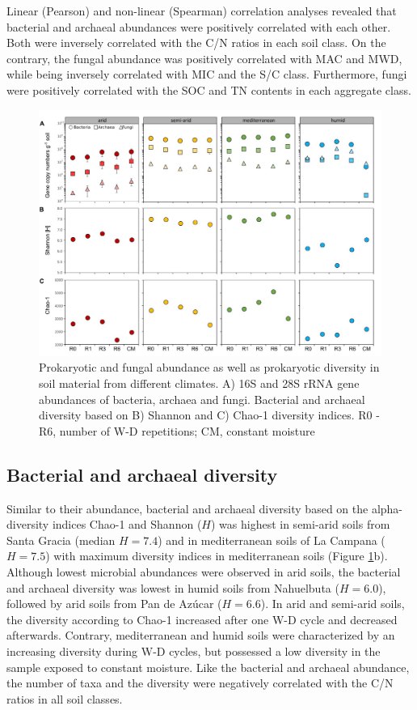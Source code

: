 Linear (Pearson) and non-linear (Spearman) correlation analyses revealed that bacterial and archaeal abundances were positively correlated with each other. Both were inversely correlated with the C/N ratios in each soil class. On the contrary, the fungal abundance was positively correlated with MAC and MWD, while being inversely correlated with MIC and the S/C class. Furthermore, fungi were positively correlated with the SOC and TN contents in each aggregate class.

\begin{figure}[H]
	\centering
	\includegraphics[width=1\textwidth]{img/M4-Figure_5.jpg}
	\caption[Prokaryotic and fungal abundance as well as prokaryotic diversity in soil material from different climates]{Prokaryotic and fungal abundance as well as prokaryotic diversity in soil material from different climates. A) 16S and 28S rRNA gene abundances of bacteria, archaea and fungi. Bacterial and archaeal diversity based on B) Shannon and C) Chao-1 diversity indices. R0 - R6, number of W-D repetitions; CM, constant moisture}
	\label{fig:M4-F5}
\end{figure}

\subsection{Bacterial and archaeal diversity}

Similar to their abundance, bacterial and archaeal diversity based on the alpha-diversity indices Chao-1 and Shannon (\(H\)) was highest in semi-arid soils from Santa Gracia (median \(H = 7.4\)) and in mediterranean soils of La Campana (\(H = 7.5\)) with maximum diversity indices in mediterranean soils (Figure \ref{fig:M4-F5}b). Although lowest microbial abundances were observed in arid soils, the bacterial and archaeal diversity was lowest in humid soils from Nahuelbuta (\(H = 6.0\)), followed by arid soils from Pan de Az{\'u}car (\(H = 6.6\)). In arid and semi-arid soils, the diversity according to Chao-1 increased after one W-D cycle and decreased afterwards. Contrary, mediterranean and humid soils were characterized by an increasing diversity during W-D cycles, but possessed a low diversity in the sample exposed to constant moisture. Like the bacterial and archaeal abundance, the number of taxa and the diversity were negatively correlated with the C/N ratios in all soil classes.

